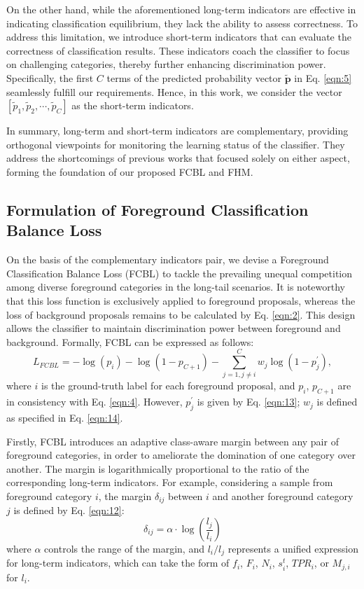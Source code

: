 \documentclass[lettersize,journal]{IEEEtran}
\begin{document}
On the other hand, while the aforementioned long-term indicators are effective in indicating classification equilibrium, they lack the ability to assess correctness.
To address this limitation, we introduce short-term indicators that can evaluate the correctness of classification results.
These indicators coach the classifier to focus on challenging categories, thereby further enhancing discrimination power.
Specifically, the first $C$ terms of the predicted probability vector $\tilde{\bm{p}}$ in Eq. \eqref{eqn:5} seamlessly fulfill our requirements.
Hence, in this work, we consider the vector $[\tilde{p}_1, \tilde{p}_2, \cdots, \tilde{p}_{C}]$ as the short-term indicators.

In summary, long-term and short-term indicators are complementary, providing orthogonal viewpoints for monitoring the learning status of the classifier.
They address the shortcomings of previous works that focused solely on either aspect, forming the foundation of our proposed FCBL and FHM.






\subsection{Formulation of Foreground Classification Balance Loss}\label{sec:3.4}

On the basis of the complementary indicators pair, we devise a Foreground Classification Balance Loss (FCBL) to tackle the prevailing unequal competition among diverse foreground categories in the long-tail scenarios. It is noteworthy that this loss function is exclusively applied to foreground proposals, whereas the loss of background proposals remains to be calculated by Eq. \eqref{eqn:2}.
This design allows the classifier to maintain discrimination power between foreground and background.
Formally, FCBL can be expressed as follows:
\begin{equation}\label{eqn:11}
    L_{FCBL} = -\log(p_i)-\log(1-p_{C+1})-\sum\limits_{j=1,j\neq i}^{C}w_j\log(1-p_{j}^{\prime}),
\end{equation}
where $i$ is the ground-truth label for each foreground proposal, and $p_i$, $p_{C+1}$ are in consistency with Eq. \eqref{eqn:4}. However, $p_j^{\prime}$ is given by Eq. \eqref{eqn:13}; $w_j$ is defined as specified in Eq. \eqref{eqn:14}.

Firstly, FCBL introduces an adaptive class-aware margin between any pair of foreground categories, in order to ameliorate the domination of one category over another.
The margin is logarithmically proportional to the ratio of the corresponding long-term indicators.
For example, considering a sample from foreground category $i$, the margin $\delta_{ij}$ between $i$ and another foreground category $j$ is defined by Eq. \eqref{eqn:12}:
\begin{equation}\label{eqn:12}
    \delta_{ij} = \alpha\cdot\log(\frac{l_j}{l_i})
\end{equation}
where $\alpha$ controls the range of the margin, and $l_i/l_j$ represents a unified expression for long-term indicators, which can take the form of $f_i$, $F_i$, $N_i$, $s_i^t$, $T\!P\!R_i$, or $M_{j,i}$ for $l_i$.
\end{document}
